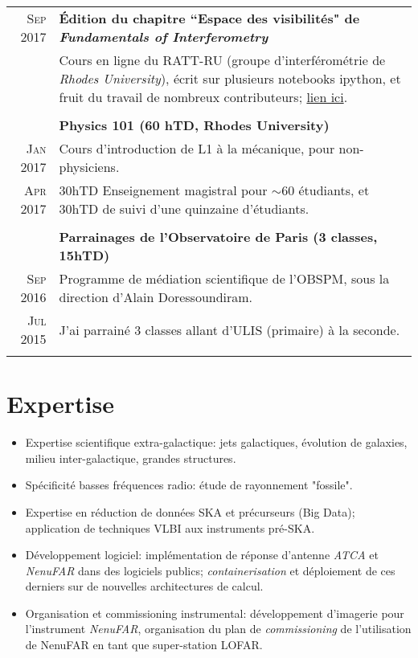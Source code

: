 \begin{tabular}{r|p{15.5cm}}
	\textsc{Sep 2017} & \textbf{\'Edition du chapitre ``Espace des visibilit\'es" de \emph{Fundamentals of Interferometry}}\\
	& Cours en ligne du RATT-RU (groupe d'interf\'erom\'etrie de \textit{Rhodes University}), \'ecrit sur plusieurs notebooks ipython, et fruit du travail de nombreux contributeurs; %
	\hyperlink{https://github.com/ratt-ru/fundamentals_of_interferometry}{lien ici}.\\                  
	\multicolumn{2}{c}{} \\

	& \textbf{Physics 101 (60 hTD, Rhodes University)}\vspace{1mm}\\
	\textsc{Jan 2017} & Cours d'introduction de L1 \`a la m\'ecanique, pour non-physiciens.\\
	\textsc{Apr 2017} & 30hTD Enseignement magistral pour $\sim$60 \'etudiants, et 30hTD de suivi d'une quinzaine d'\'etudiants.\\
	\multicolumn{2}{c}{} \\	

	
	& \textbf{Parrainages de l'Observatoire de Paris (3 classes, 15hTD)}\vspace{1mm}\\
	\textsc{Sep 2016} & Programme de m\'ediation scientifique de l'OBSPM, sous la direction d'Alain Doressoundiram.\\
	\textsc{Jul 2015} & J'ai parrain\'e 3 classes allant d'ULIS (primaire) \`a la seconde.\\
	\multicolumn{2}{c}{} \\	
	
\end{tabular}




\section{Expertise}


\begin{itemize}
	\item Expertise scientifique extra-galactique: jets galactiques, \'evolution de galaxies, milieu inter-galactique, grandes structures.
	\item Sp\'ecificit\'e basses fr\'equences radio: \'etude de rayonnement "fossile".
	\item Expertise en r\'eduction de donn\'ees SKA et pr\'ecurseurs (Big Data); application de techniques VLBI aux instruments pr\'e-SKA.
	\item D\'eveloppement logiciel: impl\'ementation de r\'eponse d'antenne \textit{ATCA} et \textit{NenuFAR} dans des logiciels publics; \textit{containerisation} et d\'eploiement de ces derniers sur de nouvelles architectures de calcul.
	\item Organisation et commissioning instrumental: d\'eveloppement d'imagerie pour l'instrument \textit{NenuFAR}, organisation du plan de \textit{commissioning} de l'utilisation de NenuFAR en tant que super-station LOFAR.
\end{itemize}


